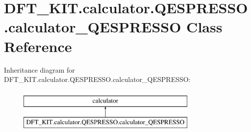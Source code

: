 \hypertarget{class_d_f_t___k_i_t_1_1calculator_1_1_q_e_s_p_r_e_s_s_o_1_1calculator___q_e_s_p_r_e_s_s_o}{\section{D\+F\+T\+\_\+\+K\+I\+T.\+calculator.\+Q\+E\+S\+P\+R\+E\+S\+S\+O.\+calculator\+\_\+\+Q\+E\+S\+P\+R\+E\+S\+S\+O Class Reference}
\label{class_d_f_t___k_i_t_1_1calculator_1_1_q_e_s_p_r_e_s_s_o_1_1calculator___q_e_s_p_r_e_s_s_o}
}
Inheritance diagram for D\+F\+T\+\_\+\+K\+I\+T.\+calculator.\+Q\+E\+S\+P\+R\+E\+S\+S\+O.\+calculator\+\_\+\+Q\+E\+S\+P\+R\+E\+S\+S\+O\+:\begin{figure}[H]
\begin{center}
\leavevmode
\includegraphics[height=2.000000cm]{class_d_f_t___k_i_t_1_1calculator_1_1_q_e_s_p_r_e_s_s_o_1_1calculator___q_e_s_p_r_e_s_s_o}
\end{center}
\end{figure}

